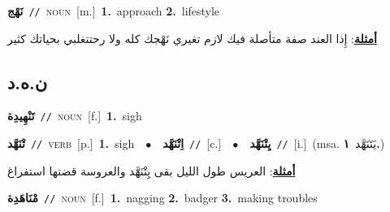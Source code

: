 \documentclass[10pt,a4paper,twoside]{article} %
\begin{document}
\begin{multicols}{2}
{\setlength\topsep{0pt}\textbf{\foreignlanguage{arabic}{نَهْج}}\ {\color{gray}\texttt{//}\color{black}}\ \textsc{noun}\ [m.]\ \textbf{1.}~approach  \textbf{2.}~lifestyle\  \begin{flushright}\color{gray}\foreignlanguage{arabic}{\textbf{\underline{\foreignlanguage{arabic}{أمثلة}}}: إِذا العند صفة متأصلة فيك لازم تغيري نَهْجك كله ولا رحتتغلبي بحياتك كثير}\end{flushright}\color{black}} \vspace{2mm}

\vspace{-3mm}
\subsection*{\color{blue}\foreignlanguage{arabic}{ن.ه.د}\color{blue}{}} 

{\setlength\topsep{0pt}\textbf{\foreignlanguage{arabic}{تَنْهِيدِة}}\ {\color{gray}\texttt{//}\color{black}}\ \textsc{noun}\ [f.]\ \textbf{1.}~sigh\ } \vspace{2mm}

{\setlength\topsep{0pt}\textbf{\foreignlanguage{arabic}{تْنَهَّد}}\ {\color{gray}\texttt{//}\color{black}}\ \textsc{verb}\ [p.]\ \textbf{1.}~sigh\ \ $\bullet$\ \ \setlength\topsep{0pt}\textbf{\foreignlanguage{arabic}{اِتْنَهَّد}}\ {\color{gray}\texttt{//}\color{black}}\ [c.]\ \ $\bullet$\ \ \setlength\topsep{0pt}\textbf{\foreignlanguage{arabic}{يِتْنَهَّد}}\ {\color{gray}\texttt{//}\color{black}}\ [i.]\ \color{gray}(msa. \foreignlanguage{arabic}{يَتَنَهَّد}~\foreignlanguage{arabic}{\textbf{١.}})\color{black}\  \begin{flushright}\color{gray}\foreignlanguage{arabic}{\textbf{\underline{\foreignlanguage{arabic}{أمثلة}}}: العريس طول الليل بقى يِتْنَهَّد والعروسة قضتها استفراغ}\end{flushright}\color{black}} \vspace{2mm}

{\setlength\topsep{0pt}\textbf{\foreignlanguage{arabic}{مْنَاهَدِة}}\ {\color{gray}\texttt{//}\color{black}}\ \textsc{noun}\ [f.]\ \textbf{1.}~nagging  \textbf{2.}~badger  \textbf{3.}~making troubles\ } \vspace{2mm}


\end{multicols}
\end{document}
